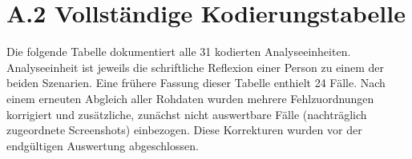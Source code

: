 \section*{A.2 Vollständige Kodierungstabelle}
\label{app:kodierungstabelle}

Die folgende Tabelle dokumentiert alle 31 kodierten Analyseeinheiten. Analyseeinheit ist jeweils die
schriftliche Reflexion einer Person zu einem der beiden Szenarien. Eine frühere Fassung dieser
Tabelle enthielt 24 Fälle. Nach einem erneuten Abgleich aller Rohdaten wurden mehrere
Fehlzuordnungen korrigiert und zusätzliche, zunächst nicht auswertbare Fälle (nachträglich
zugeordnete Screenshots) einbezogen. Diese Korrekturen wurden vor der endgültigen Auswertung
abgeschlossen.

